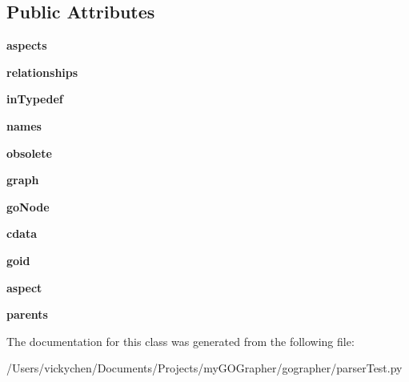 \subsection*{Public Attributes}
\begin{DoxyCompactItemize}
\item 
\hypertarget{classparser_test_1_1xml_graph_ac124fcc400ae2c819bed950b1c3a3c82}{
{\bfseries aspects}}
\label{classparser_test_1_1xml_graph_ac124fcc400ae2c819bed950b1c3a3c82}

\item 
\hypertarget{classparser_test_1_1xml_graph_a45319def72639815941a39ce2e5d3ae7}{
{\bfseries relationships}}
\label{classparser_test_1_1xml_graph_a45319def72639815941a39ce2e5d3ae7}

\item 
\hypertarget{classparser_test_1_1xml_graph_a6769b5a075cf03d15d034bb028c12e48}{
{\bfseries inTypedef}}
\label{classparser_test_1_1xml_graph_a6769b5a075cf03d15d034bb028c12e48}

\item 
\hypertarget{classparser_test_1_1xml_graph_a7f95740f88b93301ae942b90853330d3}{
{\bfseries names}}
\label{classparser_test_1_1xml_graph_a7f95740f88b93301ae942b90853330d3}

\item 
\hypertarget{classparser_test_1_1xml_graph_aefa27ccd8b928930b148015dbbcd2cc2}{
{\bfseries obsolete}}
\label{classparser_test_1_1xml_graph_aefa27ccd8b928930b148015dbbcd2cc2}

\item 
\hypertarget{classparser_test_1_1xml_graph_a2f7abf422410d18d4f83bc057bb9ea72}{
{\bfseries graph}}
\label{classparser_test_1_1xml_graph_a2f7abf422410d18d4f83bc057bb9ea72}

\item 
\hypertarget{classparser_test_1_1xml_graph_af97e222dc4023078247e172b0ffdde3f}{
{\bfseries goNode}}
\label{classparser_test_1_1xml_graph_af97e222dc4023078247e172b0ffdde3f}

\item 
\hypertarget{classparser_test_1_1xml_graph_a0d638ddc5ca775ce7e33d981fd44b6ee}{
{\bfseries cdata}}
\label{classparser_test_1_1xml_graph_a0d638ddc5ca775ce7e33d981fd44b6ee}

\item 
\hypertarget{classparser_test_1_1xml_graph_a96cf9f27f1992443bc907885acc521f6}{
{\bfseries goid}}
\label{classparser_test_1_1xml_graph_a96cf9f27f1992443bc907885acc521f6}

\item 
\hypertarget{classparser_test_1_1xml_graph_a51f3483f5a5e0f7aedf3583d13236b1e}{
{\bfseries aspect}}
\label{classparser_test_1_1xml_graph_a51f3483f5a5e0f7aedf3583d13236b1e}

\item 
\hypertarget{classparser_test_1_1xml_graph_a47c36c69366c24de7b9006a282653968}{
{\bfseries parents}}
\label{classparser_test_1_1xml_graph_a47c36c69366c24de7b9006a282653968}

\end{DoxyCompactItemize}


The documentation for this class was generated from the following file:\begin{DoxyCompactItemize}
\item 
/Users/vickychen/Documents/Projects/myGOGrapher/gographer/parserTest.py\end{DoxyCompactItemize}
